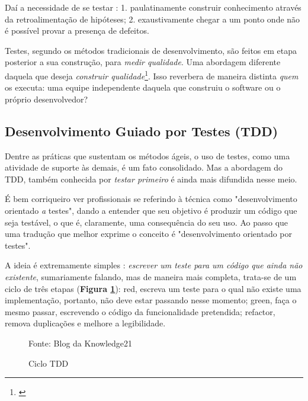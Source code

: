     Daí a necessidade de se testar \cite[pág. xxix-xxx]{Mezaros2007}: 1.
    paulatinamente construir conhecimento através da retroalimentação de
    hipóteses; 2. exaustivamente chegar a um ponto onde não é possível provar a
    presença de defeitos.

    Testes, segundo os métodos tradicionais de desenvolvimento, são feitos em
    etapa posterior a sua construção, para \emph{medir qualidade}. Uma abordagem
    diferente daquela que deseja \emph{construir qualidade}\footnote{
    \cite[pág. 7]{FarcicGarcia2015}}. Isso reverbera de maneira distinta
    \emph{quem} os executa: uma equipe independente daquela que construiu o
    software ou o próprio desenvolvedor?


    \subsection{Desenvolvimento Guiado por Testes (TDD)}

      Dentre as práticas que sustentam os métodos ágeis, o uso de testes, como
      uma atividade de suporte às demais, é um fato consolidado. Mas a abordagem
      do TDD, também conhecida por \emph{testar primeiro} é ainda mais difundida
      nesse  meio.

      É bem corriqueiro ver profissionais se referindo à  técnica como
      "desenvolvimento orientado \emph{a} testes", dando a entender que seu
      objetivo é produzir um código que seja testável, o que é, claramente, uma
      consequência do seu uso. Ao passo que uma tradução que melhor exprime o
      conceito é "desenvolvimento orientado {por} testes".

      A ideia é extremamente simples \cite[p.1]{FreemanPryce2009}: \emph{escrever um
      teste para um código que ainda não existente}, sumariamente falando, mas
      de maneira mais completa, trata-se de um ciclo de três etapas
      (\textbf{Figura \ref{fig:ciclotdd}}): red,  escreva um teste para o qual
      não existe uma implementação, portanto, não deve estar passando nesse
      momento; green, faça o mesmo passar, escrevendo o código da funcionalidade
      pretendida; refactor, remova duplicações e melhore a legibilidade.

      \begin{figure}[h!]
        \centering
        \caption{Ciclo TDD}
        Fonte: Blog da Knowledge21\footnotemark
        \label{fig:ciclotdd}
      \end{figure}

